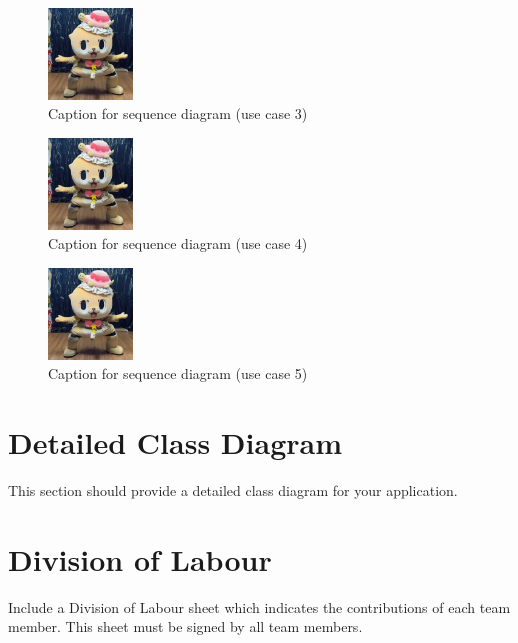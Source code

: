 \documentclass[]{article}
\begin{document}
\begin{figure}[H]
    \centering
    \includegraphics[width=0.2\textwidth]{removelater.jpg}
    \caption{Caption for sequence diagram (use case 3)}
\end{figure}

\begin{figure}[H]
    \centering
    \includegraphics[width=0.2\textwidth]{removelater.jpg}
    \caption{Caption for sequence diagram (use case 4)}
\end{figure}

\begin{figure}[H]
    \centering
    \includegraphics[width=0.2\textwidth]{removelater.jpg}
    \caption{Caption for sequence diagram (use case 5)}
\end{figure}



\section{Detailed Class Diagram}
\label{sec:detailed_class_diagram}
This section should provide a detailed class diagram for your application.

\appendix
\section{Division of Labour}
\label{sec:division_of_labour}
Include a Division of Labour sheet which indicates the contributions of each team member. This sheet must be signed by all team members.
\end{document}
